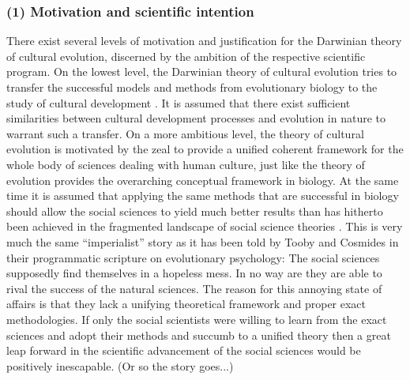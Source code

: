 \subsubsection{(1) Motivation and scientific intention} 

There exist several levels of motivation and justification for the
Darwinian theory of cultural evolution, discerned by the ambition of
the respective scientific program. On the lowest level, the Darwinian
theory of cultural evolution tries to transfer the successful models
and methods from evolutionary biology to the study of cultural
development \cite[]{arnold:2005}. It is assumed that there exist
sufficient similarities between cultural development processes and
evolution in nature to warrant such a transfer. On a more ambitious
level, the theory of cultural evolution is motivated by the zeal to
provide a unified coherent framework for the whole body of sciences
dealing with human culture, just like the theory of evolution provides
the overarching conceptual framework in biology. At the same time it
is assumed that applying the same methods that are successful in
biology should allow the social sciences to yield much better results
than has hitherto been achieved in the fragmented landscape of social
science theories \cite[p.\ 329-332]{mesoudi-laland-whiten:2006}. This
is very much the same ``imperialist'' story as it has been told by
Tooby and Cosmides in their programmatic scripture on evolutionary
psychology: The social sciences supposedly find themselves in a
hopeless mess.  In no way are they are able to rival the success of
the natural sciences. The reason for this annoying state of affairs is
that they lack a unifying theoretical framework and proper exact
methodologies. If only the social scientists were willing to learn
from the exact sciences and adopt their methods and succumb to a
unified theory then a great leap forward in the scientific advancement
of the social sciences would be positively inescapable. (Or so the
story goes...)

